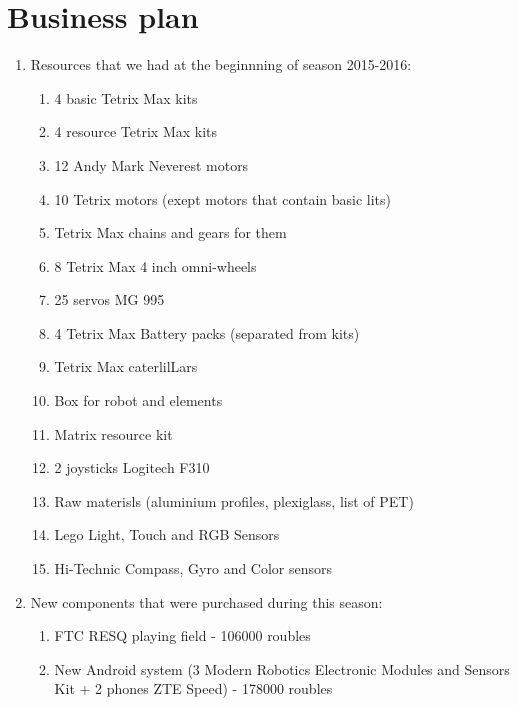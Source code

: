 \section{Business plan}
\begin{enumerate}
	\item Resources that we had at the beginnning of season 2015-2016:
	\begin{enumerate}
		\item 4 basic Tetrix Max kits
		
		\item 4 resource Tetrix Max kits
		
		\item 12 Andy Mark Neverest motors 
		
		\item 10 Tetrix motors (exept motors that contain basic lits)
		
		\item Tetrix Max chains and gears for them
		
		\item 8 Tetrix Max 4 inch omni-wheels
		
		\item 25 servos MG 995
		
		\item 4 Tetrix Max Battery packs (separated from kits)
		
		\item Tetrix Max caterlilLars
		
		\item Box for robot and elements
		
		\item Matrix resource kit
		
		\item 2 joysticks Logitech F310 
		
		\item Raw materisls (aluminium profiles, plexiglass, list of PET)
		
		\item Lego Light, Touch and RGB Sensors
		
		\item Hi-Technic Compass, Gyro and Color sensors
	\end{enumerate}
	\item New components that were purchased during this season:
	\begin{enumerate}
		\item FTC RESQ playing field - 106000 roubles
		
		\item New Android system (3 Modern Robotics Electronic Modules and Sensors Kit + 2 phones ZTE Speed) - 178000 roubles
		

\end{enumerate}
\end{enumerate}
